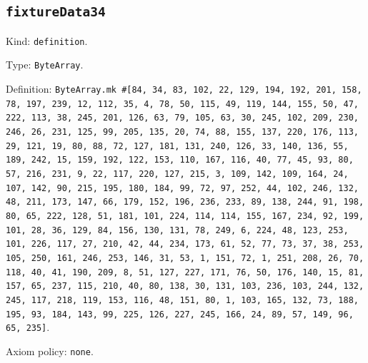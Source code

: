 \documentclass[11pt]{article}
\begin{document}
\subsection*{\texttt{fixtureData34}}
\noindent Kind: \texttt{definition}.\par
\noindent Type: \texttt{ByteArray}.\par
\noindent Definition: \texttt{ByteArray.mk \#[84, 34, 83, 102, 22, 129, 194, 192, 201, 158, 78, 197, 239, 12, 112, 35, 4, 78, 50, 115, 49, 119, 144, 155, 50, 47, 222, 113, 38, 245, 201, 126, 63, 79, 105, 63, 30, 245, 102, 209, 230, 246, 26, 231, 125, 99, 205, 135, 20, 74, 88, 155, 137, 220, 176, 113, 29, 121, 19, 80, 88, 72, 127, 181, 131, 240, 126, 33, 140, 136, 55, 189, 242, 15, 159, 192, 122, 153, 110, 167, 116, 40, 77, 45, 93, 80, 57, 216, 231, 9, 22, 117, 220, 127, 215, 3, 109, 142, 109, 164, 24, 107, 142, 90, 215, 195, 180, 184, 99, 72, 97, 252, 44, 102, 246, 132, 48, 211, 173, 147, 66, 179, 152, 196, 236, 233, 89, 138, 244, 91, 198, 80, 65, 222, 128, 51, 181, 101, 224, 114, 114, 155, 167, 234, 92, 199, 101, 28, 36, 129, 84, 156, 130, 131, 78, 249, 6, 224, 48, 123, 253, 101, 226, 117, 27, 210, 42, 44, 234, 173, 61, 52, 77, 73, 37, 38, 253, 105, 250, 161, 246, 253, 146, 31, 53, 1, 151, 72, 1, 251, 208, 26, 70, 118, 40, 41, 190, 209, 8, 51, 127, 227, 171, 76, 50, 176, 140, 15, 81, 157, 65, 237, 115, 210, 40, 80, 138, 30, 131, 103, 236, 103, 244, 132, 245, 117, 218, 119, 153, 116, 48, 151, 80, 1, 103, 165, 132, 73, 188, 195, 93, 184, 143, 99, 225, 126, 227, 245, 166, 24, 89, 57, 149, 96, 65, 235]}.\par
\noindent Axiom policy: \texttt{none}.\par
\end{document}
